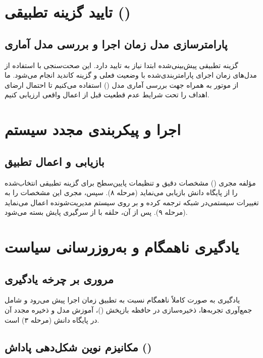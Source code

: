 \documentclass[oneside,openany,phd]{TMU-Thesis}
\begin{document}
\section{تایید گزینه تطبیقی ()}

\subsection{پارامترسازی مدل زمان اجرا و بررسی مدل آماری}

گزینه تطبیقی پیش‌بینی‌شده ابتدا نیاز به تایید دارد. این صحت‌سنجی با استفاده از مدل‌های زمان اجرای پارامتربندی‌شده با وضعیت فعلی و گزینه کاندید انجام می‌شود. ما از موتور  به همراه  جهت بررسی آماری مدل () استفاده می‌کنیم تا احتمال ارضای اهداف را تحت شرایط عدم قطعیت قبل از اعمال واقعی ارزیابی کنیم.

\section{اجرا و پیکربندی مجدد سیستم}

\subsection{بازیابی و اعمال تطبیق}

مؤلفه مجری () مشخصات دقیق و تنظیمات پایین‌سطح برای گزینه تطبیقی انتخاب‌شده را از پایگاه دانش بازیابی می‌نماید (مرحله ۸). سپس، مجری این مشخصات را به تغییرات سیستمی‌در شبکه ترجمه کرده و بر روی سیستم مدیریت‌شونده اعمال می‌نماید (مرحله ۹). پس از آن، حلقه با از سرگیری پایش بسته می‌شود.

\section{یادگیری ناهمگام  و به‌روزرسانی سیاست}

\subsection{مروری بر چرخه یادگیری}

یادگیری به صورت کاملاً ناهمگام نسبت به تطبیق زمان اجرا پیش می‌رود و شامل جمع‌آوری تجربه‌ها، ذخیره‌سازی در حافظه بازپخش ()، آموزش مدل و ذخیره مجدد آن در پایگاه دانش (مرحله ۳) است.

\subsection{مکانیزم نوین شکل‌دهی پاداش ()}
\end{document}
